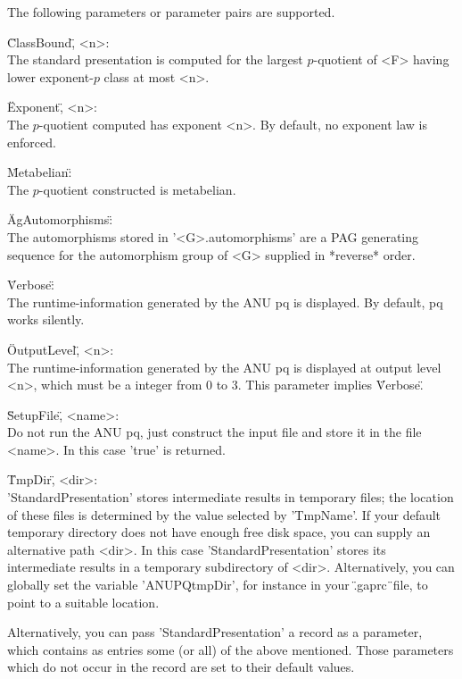 The following parameters or parameter pairs are supported.

\"ClassBound\", <n>: \\
    The  standard presentation is  computed for  the largest $p$-quotient
    of <F> having lower exponent-$p$ class at most <n>.

\"Exponent\", <n>: \\
    The $p$-quotient computed has  exponent <n>.  By default, no exponent
    law is enforced.

\"Metabelian\": \\
    The $p$-quotient constructed is metabelian.

\"AgAutomorphisms\": \\
    The automorphisms stored in '<G>.automorphisms' are  a PAG generating
    sequence  for the automorphism group  of  <G>  supplied  in *reverse*
    order.

\"Verbose\": \\
    The  runtime-information generated by  the  ANU  pq is displayed.  By
    default, pq works silently.

\"OutputLevel\", <n>: \\
    The  runtime-information generated  by  the  ANU pq is  displayed  at
    output level  <n>, which  must  be  a integer  from  0  to  3.   This
    parameter implies \"Verbose\".

\"SetupFile\", <name>: \\
    Do not run the ANU pq, just construct the input file and  store it in
    the file <name>. In this case 'true' is returned.

\"TmpDir\", <dir>: \\
    'StandardPresentation'  stores  intermediate  results  in   temporary
    files;  the location  of  these  files  is  determined by  the  value
    selected by 'TmpName'.  If your default  temporary directory does not
    have enough  free  disk  space,  you  can supply an  alternative path
    <dir>.  In this case  'StandardPresentation' stores its  intermediate
    results in a temporary subdirectory of <dir>.  Alternatively, you can
    globally  set  the  variable  'ANUPQtmpDir',  for  instance  in  your
    \".gaprc\"\ file, to point to a suitable location.

Alternatively,  you  can  pass   'StandardPresentation'  a  record  as  a
parameter,  which  contains  as  entries  some  (or  all)  of  the  above
mentioned.  Those parameters which do not occur in the record are set  to
their default values.

